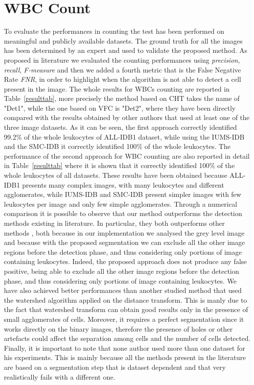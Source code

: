 \documentclass[final,a4paper,12pt,english]{UnicaPhdThesis3}
\begin{document}
\section{WBC Count} %
To evaluate the performances in counting the test has been performed on meaningful and publicly available datasets.
The ground truth for all the images has been determined by an expert and used to validate the proposed method. As proposed in literature we evaluated the counting performances using \textit{precision}, \textit{recall}, \textit{F-measure} and then we added a fourth metric that is the False Negative Rate \textit{FNR}, in order to highlight when the algorithm is not able to detect a cell present in the image. The whole results for WBCs counting are reported in Table~\ref{resulttab}, more precisely the method based on CHT takes the name of "Det1", while the one based on VFC is "Det2", where they have been directly compared with the results obtained by other authors that used at least one of the three image datasets. As it can be seen, the first approach correctly identified 99.2\% of the whole leukocytes of ALL-IDB1 dataset, while using the IUMS-IDB and the SMC-IDB it correctly identified 100\% of the whole leukocytes. The performance of the second approach for WBC counting are also reported in detail in Table~\ref{resulttab} where it is shown that it correctly identified 100\% of the whole leukocytes of all datasets. These results have been obtained because ALL-IDB1 presents many complex images, with many leukocytes and different agglomerates, while IUMS-IDB and SMC-IDB present simpler images with few leukocytes per image and only few simple agglomerates. Through a numerical comparison it is possible to observe that our method outperforms the detection methods existing in literature. In particular, they both outperforms other methods \cite{Mahmood, Alomari}, both because in our implementation we analysed the grey level image and because with the proposed segmentation we can exclude all the other image regions before the detection phase, and thus considering only portions of image containing leukocytes. Indeed, the proposed approach does not produce any false positive, being able to exclude all the other image regions before the detection phase, and thus considering only portions of image containing leukocytes. We have also achieved better performances than another studied method \cite{Put14b} that used the watershed algorithm applied on the distance transform. This is manly due to the fact that watershed transform can obtain good results only in the presence of small agglomerates of cells. Moreover, it requires a perfect segmentation since it works directly on the binary images, therefore the presence of holes or other artefacts could affect the separation among cells and the number of cells detected. Finally, it is important to note that none author used more than one dataset for his experiments. This is mainly because all the methods present in the literature are based on a segmentation step that is dataset dependent and that very realistically fails with a different one.
\end{document}
